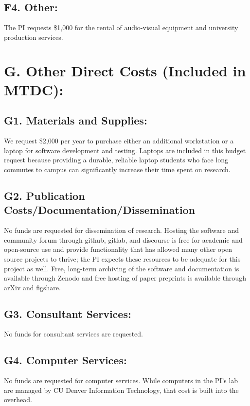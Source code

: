 \documentclass[11pt,oneside]{memoir}
\begin{document}
\subsection*{F4. Other:}  The PI requests \$1,000 for the rental of audio-visual equipment and university production services.

\section*{G. Other Direct Costs (Included in MTDC):}
\subsection*{G1. Materials and Supplies:}
We request \$2,000 per year to purchase either an additional workstation or a laptop for software development and testing.  Laptops are included in this budget request because providing a durable, reliable laptop students who face long commutes to campus can significantly increase their time spent on research.

\subsection*{G2. Publication Costs/Documentation/Dissemination}
No funds are requested for dissemination of research.  Hosting the software and community forum through github, gitlab, and discourse is free for academic and open-source use and provide functionality that has allowed many other open source projects to thrive; the PI expects these resources to be adequate for this project as well.  Free, long-term archiving of the software and documentation is available through Zenodo and free hosting of paper preprints is available through arXiv and figshare.  %

\subsection*{G3. Consultant Services:}
No funds for consultant services are requested.

\subsection*{G4. Computer Services:}
No funds are requested for computer services.  While computers in the PI's lab are managed by CU Denver Information Technology, that cost is built into the overhead.
\end{document}
